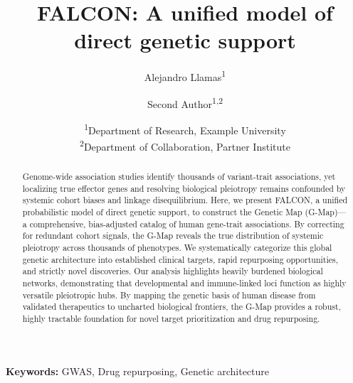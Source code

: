 \documentclass[11pt, a4paper]{article}
\begin{document}
\title{FALCON: A unified model of direct genetic support}
\author{Alejandro Llamas\textsuperscript{1} \and Second Author\textsuperscript{1,2}}
\date{\textsuperscript{1}Department of Research, Example University  \\  \textsuperscript{2}Department of Collaboration, Partner Institute}

\begin{abstract}
Genome-wide association studies identify thousands of variant-trait associations, yet localizing true effector genes and resolving biological pleiotropy remains confounded by systemic cohort biases and linkage disequilibrium. Here, we present FALCON, a unified probabilistic model of direct genetic support, to construct the Genetic Map (G-Map)—a comprehensive, bias-adjusted catalog of human gene-trait associations. By correcting for redundant cohort signals, the G-Map reveals the true distribution of systemic pleiotropy across thousands of phenotypes. We systematically categorize this global genetic architecture into established clinical targets, rapid repurposing opportunities, and strictly novel discoveries. Our analysis highlights heavily burdened biological networks, demonstrating that developmental and immune-linked loci function as highly versatile pleiotropic hubs. By mapping the genetic basis of human disease from validated therapeutics to uncharted biological frontiers, the G-Map provides a robust, highly tractable foundation for novel target prioritization and drug repurposing.
\end{abstract}
\textbf{Keywords:} GWAS, Drug repurposing, Genetic architecture








\end{document}
